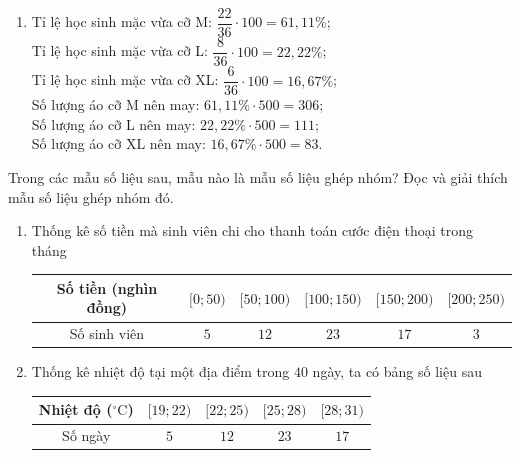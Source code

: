 \begin{ex}
{\begin{enumerate}
			\item Tỉ lệ  học sinh mặc vừa cỡ M: $\dfrac{22}{36} \cdot 100=61{,}11\%$;\\
			Tỉ lệ học sinh  mặc vừa cỡ L: $\dfrac{8}{36} \cdot 100=22{,}22\%$;\\
			Tỉ lệ học sinh  mặc vừa cỡ XL: $\dfrac{6}{36} \cdot 100=16{,}67\%$;\\
			Số lượng áo cỡ M nên may: $61{,}11\% \cdot 500=306$;\\ 
			Số  lượng áo cỡ L nên may: $22{,}22\% \cdot 500=111$;\\
			Số lượng  áo cỡ XL nên may: $16{,}67\% \cdot 500=83$.
	\end{enumerate}}
\end{ex}

\begin{ex}%
	Trong các mẫu số liệu sau, mẫu nào là  mẫu số liệu ghép nhóm? Đọc và giải thích mẫu số liệu ghép nhóm đó.
	\begin{enumerate}
		\item Thống kê số  tiền mà sinh viên chi cho thanh toán cước điện thoại trong tháng
		\begin{center}
			\begin{tabular}{|c|c|c|c|c|c|}
				\hline 
				Số tiền (nghìn đồng) & $[0;50)$ & $[50;100)$ &  $[100;150)$ & $[150;200)$ & $[200;250)$ \\
				 \hline
				Số sinh viên  & $5$ & $12$ & $23$ & $17$ & $3$ \\
				\hline 
			\end{tabular}
		\end{center}
		\item Thống kê nhiệt độ tại một địa điểm trong $40$ ngày, ta có  bảng số liệu sau
		\begin{center}
			\begin{tabular}{|c|c|c|c|c|}
				 \hline
				Nhiệt độ ($^\circ\text{C}$) & $[19;22)$ & $[22;25)$ & $[25;28)$ & $[28;31)$ \\ 
				 \hline
				Số ngày &  $5$ & $12$ & $23$ & $17$ \\
				 \hline
			\end{tabular}
		\end{center}
	\end{enumerate}
\end{ex}
